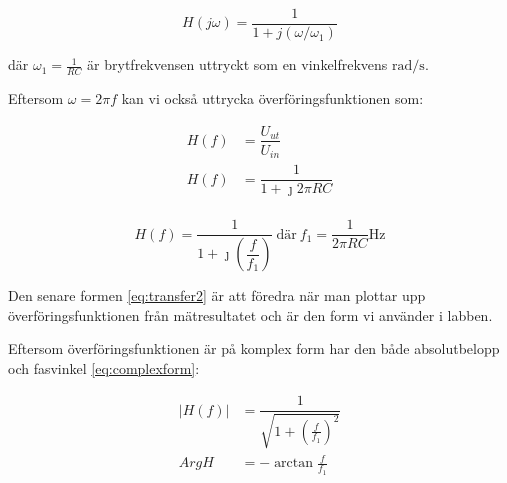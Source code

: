 \begin{equation}\label{eq:transfer}
  H(j\omega) = \dfrac{1}{1+j(\omega/\omega_1)}
\end{equation}

där $\omega_1 = \tfrac{1}{R C}$ är brytfrekvensen uttryckt som en
vinkelfrekvens $\si{\radian\per\second}$.


\par 
Eftersom $\omega = 2 \pi f$ kan vi också uttrycka överföringsfunktionen som:

\begin{equation*}
  \begin{split}
    H(f) &= \dfrac{U_{ut}}{U_{in}}        \\
    H(f) &= \dfrac{1}{1+\jmath 2 \pi R C} \\
  \end{split}
\end{equation*}

\begin{equation}\label{eq:transfer2}
  H(f) = \dfrac{1}{1+\jmath (\dfrac{f}{f_1})}\
  \text{där}\ f_1 = \dfrac{1}{2 \pi R C} \si{\Hz}
\end{equation}


\par Den senare formen \eqref{eq:transfer2} är att föredra när man plottar
upp överföringsfunktionen från mätresultatet och är den form vi använder i
labben.

Eftersom överföringsfunktionen är på komplex form har den både absolutbelopp
och fasvinkel \eqref{eq:complexform}:

\begin{equation}\label{eq:complexform}
  \begin{split}
    |H(f)| &= \dfrac{1}{\sqrt{1+(\frac{f}{f_1})^2}} \\
      ArgH &= -\arctan{\frac{f}{f_1}}
  \end{split}
\end{equation}




